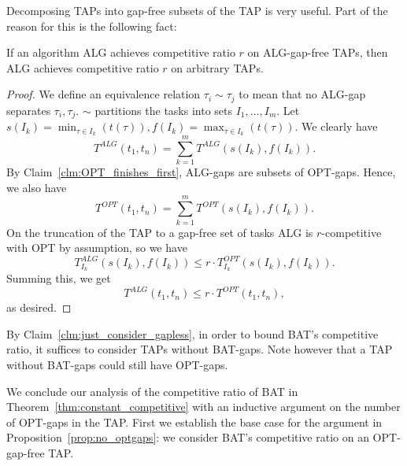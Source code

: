 Decomposing TAPs into gap-free subsets of the TAP is very useful.
Part of the reason for this is the following fact:
\begin{claim}
  \label{clm:just_consider_gapless}
  If an algorithm ALG achieves competitive ratio $r$ on
  ALG-gap-free TAPs, then ALG achieves 
  competitive ratio $r$ on arbitrary TAPs.
\end{claim}
\begin{proof}
  We define an equivalence relation $\tau_i \sim \tau_j$ to mean
  that no ALG-gap separates $\tau_i,\tau_j$. $\sim$ partitions
  the tasks into sets $I_1, \ldots, I_m$. Let
  $s(I_k)=\min_{\tau\in I_k}(t(\tau)), f(I_k)= \max_{\tau\in
  I_k}(t(\tau)).$ We clearly have 
  $$T^{ALG}(t_1, t_n) = \sum_{k=1}^m T^{ALG}(s(I_k), f(I_k)).$$
  By Claim~\ref{clm:OPT_finishes_first}, ALG-gaps are subsets of OPT-gaps.
  Hence, we also have 
  $$T^{OPT}(t_1, t_n) = \sum_{k=1}^m T^{OPT}(s(I_k), f(I_k)).$$
  On the truncation of the TAP to a gap-free set of tasks ALG is
  $r$-competitive with OPT by assumption, so we have
  $$T_{I_k}^{ALG}(s(I_k), f(I_k)) \le r\cdot
  T_{I_k}^{OPT}(s(I_k), f(I_k)).$$
  Summing this, we get $$T^{ALG}(t_1, t_n) \le r\cdot T^{OPT}(t_1,
  t_n),$$ as desired.
\end{proof}

By Claim~\ref{clm:just_consider_gapless}, in order to bound BAT's
competitive ratio, it suffices to consider TAPs
without BAT-gaps. Note however that a TAP without
BAT-gaps could still have OPT-gaps.

We conclude our analysis of the competitive ratio of BAT in
Theorem~\ref{thm:constant_competitive} with an inductive argument on
the number of OPT-gaps in the TAP.
First we establish the base case for the argument in
Proposition~\ref{prop:no_optgaps}: we consider
BAT's competitive ratio on an OPT-gap-free TAP.  

